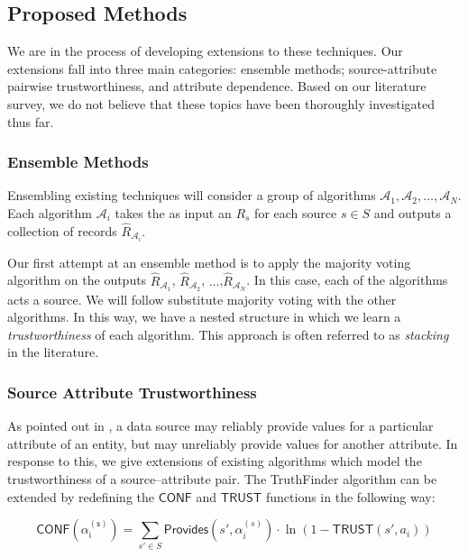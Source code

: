 \documentclass{acm_proc_article-sp}
\begin{document}
\subsection{Proposed Methods}

We are in the process of developing extensions to these techniques. Our extensions fall into three main categories: ensemble methods; source-attribute pairwise trustworthiness, and attribute dependence. Based on our literature survey, we do not believe that these topics have been thoroughly investigated thus far. 


\subsubsection{Ensemble Methods}

Ensembling existing techniques will consider a group of algorithms $\mathcal{A}_1,\mathcal{A}_2,\dots,\mathcal{A}_N$. Each algorithm $\mathcal{A}_i$ takes the as input an $R_s$ for each source $s \in S$ and outputs a collection of records $\hat{R}_{\mathcal{A}_i}$. 

Our first attempt at an ensemble method is to apply the majority voting algorithm on the outputs $\hat{R}_{\mathcal{A}_1}$, $\hat{R}_{\mathcal{A}_2}$, $\dots$,$\hat{R}_{\mathcal{A}_N}$. In this case, each of the algorithms acts a source. We will follow substitute majority voting with the other algorithms. In this way, we have a nested structure in which we learn a \emph{trustworthiness} of each algorithm. This approach is often referred to as \emph{stacking} in the literature. 

\subsubsection{Source Attribute Trustworthiness}

As pointed out in \cite{dong:truth}, a data source may reliably provide values for a particular attribute of an entity, but may unreliably provide values for another attribute. In response to this, we give extensions of existing algorithms which model the trustworthiness of a source--attribute pair.  The {\sc TruthFinder} algorithm can be extended by redefining the $\mathsf{CONF}$ and $\mathsf{TRUST}$ functions in the following way: 


\begin{equation}
\mathsf{CONF(\alpha_i^{(s)})} = \sum_{s' \in S} \mathsf{Provides}(s',\alpha_i^{(s)}) \cdot \ln(1-\mathsf{TRUST}(s',a_i))
\end{equation}
\end{document}
